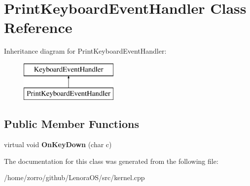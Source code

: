 \hypertarget{classPrintKeyboardEventHandler}{}\section{Print\+Keyboard\+Event\+Handler Class Reference}
\label{classPrintKeyboardEventHandler}
Inheritance diagram for Print\+Keyboard\+Event\+Handler\+:\begin{figure}[H]
\begin{center}
\leavevmode
\includegraphics[height=2.000000cm]{classPrintKeyboardEventHandler}
\end{center}
\end{figure}
\subsection*{Public Member Functions}
\begin{DoxyCompactItemize}
\item 
\mbox{\label{classPrintKeyboardEventHandler_a6f529d75127cb52467587c8efc347d98}} 
virtual void {\bfseries On\+Key\+Down} (char c)
\end{DoxyCompactItemize}


The documentation for this class was generated from the following file\+:\begin{DoxyCompactItemize}
\item 
/home/zorro/github/\+Lenora\+O\+S/src/kernel.\+cpp\end{DoxyCompactItemize}
